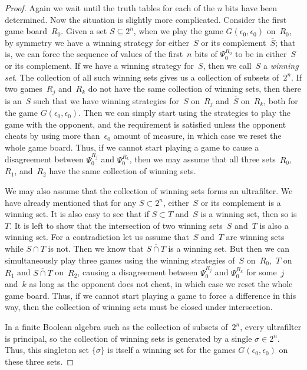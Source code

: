 \documentclass{LMCS}
\newcommand{\0}{\mathbf{0}}
\newcommand{\<}{\langle}
\renewcommand{\>}{\rangle}
\begin{document}
\begin{proof}
Again we wait until the truth tables for each of the $n$ bits have been
determined. Now the situation is slightly more complicated. Consider the
first game board~$R_0$. Given a set $S\subseteq 2^n$, when we play the game
$G(\epsilon_0,\epsilon_0)$ on~$R_0$, by symmetry we have a winning strategy
for either~$S$ or its complement~$\overline{S}$; that is, we can force the
sequence of values of the first~$n$ bits of $\Psi_0^{R_0}$ to be in
either~$S$ or its complement. If we have a winning strategy for~$S$, then we
call~$S$ a {\em winning set}. The collection of all such winning sets gives
us a collection of subsets of~$2^n$. If two games~$R_j$ and~$R_k$ do not have
the same collection of winning sets, then there is an~$S$ such that we have
winning strategies for~$S$ on~$R_j$ and~$\overline{S}$ on~$R_k$, both for the
game $G(\epsilon_0,\epsilon_0)$. Then we can simply start using the
strategies to play the game with the opponent, and the requirement is
satisfied unless the opponent cheats by using more than~$\epsilon_0$ amount
of measure, in which case we reset the whole game board. Thus, if we cannot
start playing a game to cause a disagreement between $\Psi_0^{R_j}$ and
$\Psi_0^{R_k}$, then we may assume that all three sets~$R_0$,~$R_1$,
and~$R_2$ have the same collection of winning sets.

We may also assume that the collection of winning sets forms an ultrafilter.
We have already mentioned that for any $S\subset 2^n$, either~$S$ or its
complement is a winning set.  It is also easy to see that if $S\subset T$
and~$S$ is a winning set, then so is~$T$.  It is left to show that the
intersection of two winning sets~$S$ and~$T$ is also a winning set.  For a
contradiction let us assume that~$S$ and~$T$ are winning sets while $S\cap T$
is not. Then we know that $\overline{S\cap T}$ is a winning set.  But then we
can simultaneously play three games using the winning strategies of~$S$
on~$R_0$,~$T$ on~$R_1$ and $\overline{S\cap T}$ on~$R_2$, causing a
disagreement between $\Psi_0^{R_j}$ and $\Psi_0^{R_k}$ for some~$j$ and~$k$
as long as the opponent does not cheat, in which case we reset the whole game
board.  Thus, if we cannot start playing a game to force a difference in this
way, then the collection of winning sets must be closed under intersection.

In a finite Boolean algebra such as the collection of subsets of~$2^n$, every
ultrafilter is principal, so the collection of winning sets is generated by a
single $\sigma\in 2^n$. Thus, this singleton set $\{\sigma\}$ is itself a
winning set for the games $G(\epsilon_0,\epsilon_0)$ on these three sets.


\end{proof}
\end{document}

